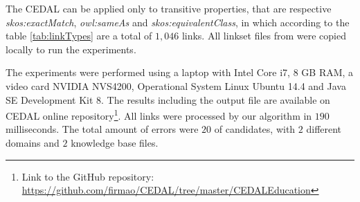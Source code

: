 The CEDAL can be applied only to transitive properties, that are respective \emph{skos:exactMatch}, \emph{owl:sameAs} and \emph{skos:equivalentClass}, in which according to the table \ref{tab:linkTypes} are a total of $1,046$ links. All linkset files from were copied locally to run the experiments.

\begin{table}[htb] 
\centering
\caption{Educational Linksets}
\label{tab:linkTypes}
\end{table}
%
The experiments were performed using a laptop with Intel Core i7, 8 GB RAM, a video card NVIDIA NVS4200, Operational System Linux Ubuntu 14.4 and Java SE Development Kit 8. The results including the output file are available on CEDAL online repository\footnote{Link to the GitHub repository:  \url{https://github.com/firmao/CEDAL/tree/master/CEDALEducation}}.
All links were processed by our algorithm in $190$ milliseconds. The total amount of errors were $20$ of candidates, with $2$ different domains and $2$ knowledge base files.

